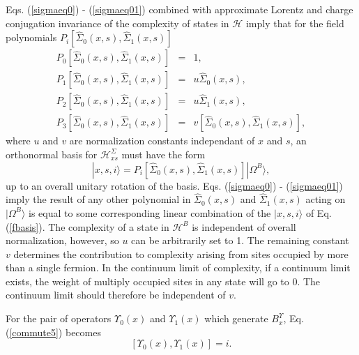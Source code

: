 \documentclass[twocolumn,amsmath,amssymb]{revtex4-1}
\begin{document}
Eqs. (\ref{sigmaeq0}) - (\ref{sigmaeq01}) combined with
approximate Lorentz and charge conjugation invariance of
the complexity of states in $\mathcal{H}$ imply that
for the field polynomials $P_i[ \hat{\Sigma}_0( x, s), \hat{\Sigma}_1( x, s)]$
\begin{subequations}
  \begin{eqnarray}
    \label{hsigma0}
          P_0[ \hat{\Sigma}_0( x, s), \hat{\Sigma}_1( x, s)] & = & 1, \\
    \label{hsigma1}
          P_1[ \hat{\Sigma}_0( x, s), \hat{\Sigma}_1( x, s)] & = & u \hat{\Sigma}_0( x, s), \\
    \label{hsigma2}
          P_2[ \hat{\Sigma}_0( x, s), \hat{\Sigma}_1( x, s)] & = & u \hat{\Sigma}_1( x, s), \\
    \label{hsigma3}
          P_3[ \hat{\Sigma}_0( x, s), \hat{\Sigma}_1( x, s)] & = & v [\hat{\Sigma}_0( x, s), \hat{\Sigma}_1( x, s)],
  \end{eqnarray}
\end{subequations}
where $u$ and $v$ are normalization constants independant of $x$ and $s$,
an orthonormal basis for $\mathcal{H}^\Sigma_{xs}$ must
have the form
\begin{equation}
  \label{fbasis}
  | x, s, i \rangle  = P_i[ \hat{\Sigma}_0( x, s), \hat{\Sigma}_1( x, s)] |\Omega^B \rangle ,
\end{equation}
up to an overall unitary rotation of the basis.  Eqs. (\ref{sigmaeq0}) - (\ref{sigmaeq01})
imply the result of any other
polynomial in $\hat{\Sigma}_0( x, s)$ and $\hat{\Sigma}_1( x, s)$ acting on $|\Omega^B \rangle $
is equal to some corresponding linear combination of the $|x, s, i \rangle $ of
Eq. (\ref{fbasis}).
The complexity of a state in $\mathcal{H}^B$ is independent of overall normalization,
however, so $u$ can be arbitrarily set to 1. The remaining constant $v$ determines
the contribution to complexity arising from sites occupied by more than a single fermion.
In the continuum limit of complexity, if a continuum limit exists, the weight of
multiply occupied sites in any state will go to 0. The continuum limit
should therefore be independent of $v$. 

For the pair of operators $\Upsilon_0(x)$
and $\Upsilon_1(x)$ which generate $B^\Upsilon_x$,
Eq. (\ref{commute5}) becomes
\begin{equation}
    \label{upseq}
    [\Upsilon_0( x), \Upsilon_1( x)] = i.
\end{equation}
\end{document}
